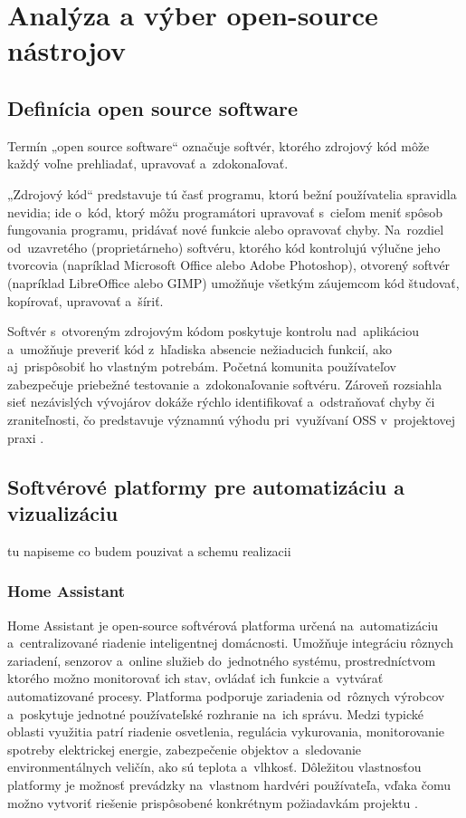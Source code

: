 \section{Analýza a výber open-source nástrojov}
\subsection{Definícia open source software}
Termín „open source software“ označuje softvér, 
ktorého zdrojový kód môže každý voľne prehliadať, 
upravovať a~zdokonaľovať.

„Zdrojový kód“ predstavuje tú časť programu, 
ktorú bežní používatelia spravidla nevidia; 
ide o~kód, ktorý môžu programátori upravovať 
s~cieľom meniť spôsob fungovania programu, pridávať 
nové funkcie alebo opravovať chyby. Na~rozdiel od~uzavretého 
(proprietárneho) softvéru, ktorého kód kontrolujú výlučne 
jeho tvorcovia (napríklad Microsoft Office alebo Adobe Photoshop), 
otvorený softvér (napríklad LibreOffice alebo GIMP) 
umožňuje všetkým záujemcom kód študovať, kopírovať, upravovať a~šíriť.

Softvér s~otvoreným zdrojovým kódom poskytuje kontrolu nad~aplikáciou 
a~umožňuje preveriť kód z~hľadiska absencie nežiaducich funkcií, 
ako aj~prispôsobiť ho vlastným potrebám. Početná komunita 
používateľov zabezpečuje priebežné testovanie a~zdokonaľovanie softvéru. 
Zároveň rozsiahla sieť nezávislých vývojárov dokáže rýchlo 
identifikovať a~odstraňovať chyby či zraniteľnosti, 
čo predstavuje významnú výhodu pri~využívaní OSS v~projektovej 
praxi \cite{what_is_open_source}.

\subsection{Softvérové platformy pre automatizáciu a vizualizáciu}
tu napiseme co budem pouzivat a schemu realizacii
\subsubsection{Home Assistant}
Home Assistant je open-source softvérová platforma určená 
na~automatizáciu a~centralizované riadenie inteligentnej domácnosti. 
Umožňuje integráciu rôznych zariadení, senzorov a~online služieb 
do~jednotného systému, prostredníctvom ktorého možno monitorovať ich 
stav, ovládať ich funkcie a~vytvárať automatizované procesy. 
Platforma podporuje zariadenia od~rôznych výrobcov a~poskytuje 
jednotné používateľské rozhranie na~ich správu. Medzi typické 
oblasti využitia patrí riadenie osvetlenia, regulácia vykurovania, 
monitorovanie spotreby elektrickej energie, zabezpečenie objektov 
a~sledovanie environmentálnych veličín, ako sú teplota a~vlhkosť. 
Dôležitou vlastnosťou platformy je možnosť prevádzky na~vlastnom 
hardvéri používateľa, vďaka čomu možno vytvoriť riešenie 
prispôsobené konkrétnym požiadavkám projektu \cite{architektura_ha}.

